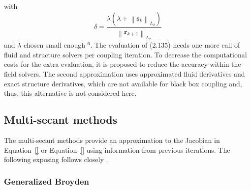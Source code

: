 with
\[
\delta=\frac{\lambda\left(\lambda+\left\|\boldsymbol{s}_{k}\right\|_{L_{2}}\right)}{\left\|\boldsymbol{r}_{k+1}\right\|_{L_{2}}}
\]
and \(\lambda\) chosen small enough \({ }^{6}\). The evaluation of (2.135) needs one more call of fluid and structure solvers per coupling iteration. To decrease the computational costs for the extra evaluation, it is proposed to reduce the accuracy within the field solvers. The second approximation uses approximated fluid derivatives and exact structure derivatives, which are not available for black box coupling and, thus, this alternative is not considered here.

\subsection{Multi-secant methods}

The multi-secant methods provide an approximation to the Jacobian in Equation~\eqref{} or Equation~\eqref{} using information from previous iterations.
The following exposing follows closely \cite{fang_two_2009}.

\subsubsection{Generalized Broyden}

